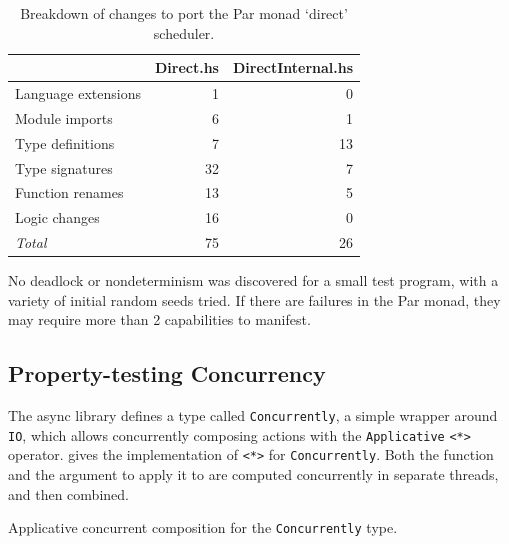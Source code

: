 \begin{table}
  \centering
  \begin{tabular}{lrr} \toprule
    & Direct.hs & DirectInternal.hs \\ \midrule
    Language extensions & 1 & 0 \\
    Module imports & 6 & 1 \\
    Type definitions & 7 & 13 \\
    Type signatures & 32 & 7 \\
    Function renames & 13 & 5 \\
    Logic changes & 16 & 0 \\ \midrule
    \emph{Total} & 75 & 26 \\ \bottomrule
  \end{tabular}
  \caption{Breakdown of changes to port the Par monad `direct' scheduler.}\label{tbl:example-parmonad-diff}
\end{table}

No deadlock or nondeterminism was discovered for a small test program,
with a variety of initial random seeds tried.  If there are failures
in the Par monad, they may require more than 2 capabilities to
manifest.

\subsection{Property-testing Concurrency}

The async\cite{async} library defines a type called
\verb|Concurrently|, a simple wrapper around \verb|IO|, which allows
concurrently composing actions with the \verb|Applicative| \verb|<*>|
operator.   gives the implementation of
\verb|<*>| for \verb|Concurrently|.  Both the function and the
argument to apply it to are computed concurrently in separate threads,
and then combined.

\begin{listing}
\centering
{}
\caption{Applicative concurrent composition for the \texttt{Concurrently} type.}\label{lst:concurrently}
\end{listing}

